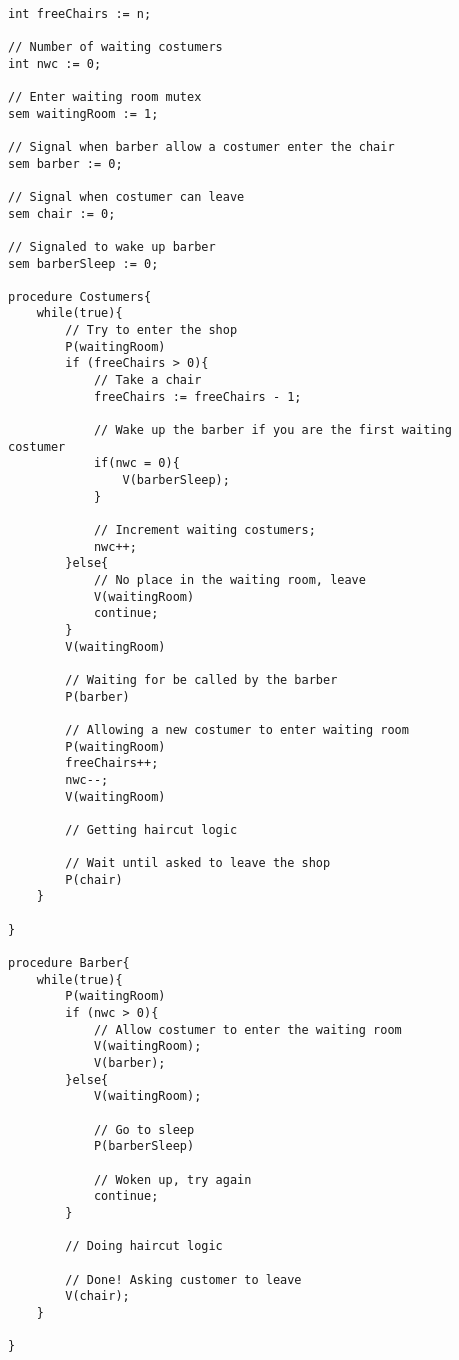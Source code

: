 \begin{lstlisting}

int freeChairs := n; 

// Number of waiting costumers
int nwc := 0;

// Enter waiting room mutex 
sem waitingRoom := 1; 

// Signal when barber allow a costumer enter the chair
sem barber := 0; 

// Signal when costumer can leave 
sem chair := 0; 

// Signaled to wake up barber
sem barberSleep := 0; 

procedure Costumers{
    while(true){
        // Try to enter the shop
        P(waitingRoom)
        if (freeChairs > 0){
            // Take a chair 
            freeChairs := freeChairs - 1; 

            // Wake up the barber if you are the first waiting costumer
            if(nwc = 0){
                V(barberSleep);
            }

            // Increment waiting costumers; 
            nwc++;
        }else{
            // No place in the waiting room, leave 
            V(waitingRoom)
            continue;
        }
        V(waitingRoom)

        // Waiting for be called by the barber
        P(barber)

        // Allowing a new costumer to enter waiting room
        P(waitingRoom)
        freeChairs++;
        nwc--; 
        V(waitingRoom)

        // Getting haircut logic 

        // Wait until asked to leave the shop 
        P(chair)
    }

}

procedure Barber{
    while(true){
        P(waitingRoom)
        if (nwc > 0){
            // Allow costumer to enter the waiting room
            V(waitingRoom);
            V(barber);
        }else{
            V(waitingRoom);

            // Go to sleep
            P(barberSleep)

            // Woken up, try again
            continue;
        }

        // Doing haircut logic

        // Done! Asking customer to leave
        V(chair);
    }

}

\end{lstlisting}

